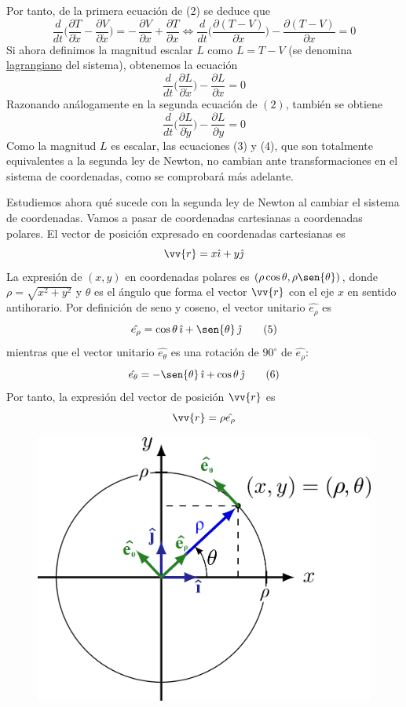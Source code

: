 \documentclass[12pt]{report}
\begin{document}
Por tanto, de la primera ecuación de (2) se deduce que
\[\frac{d}{dt}\biggl(\frac{\partial T}{\partial \dot{x}} - \frac{\partial V}{\partial \dot{x}}\biggr) = - \, \frac{\partial V}{\partial x} + \frac{\partial T}{\partial x} \iff \frac{d}{dt}\biggl( \frac{\partial (T-V)}{\partial \dot{x}} \biggr) - \frac{\partial (T-V)}{\partial x} = 0\]
Si ahora definimos la magnitud escalar $L$ como $L = T - V$ (se denomina \ul{lagrangiano} del sistema), obtenemos la ecuación
\[\frac{d}{dt}\biggl( \frac{\partial L}{\partial \dot{x}}\biggr) - \frac{\partial L}{\partial x} = 0 \tag{3}\]
Razonando análogamente en la segunda ecuación de $(2)$, también se obtiene
\[\frac{d}{dt}\biggl( \frac{\partial L}{\partial \dot{y}}\biggr) - \frac{\partial L}{\partial y} = 0 \tag{4}\]
Como la magnitud $L$ es escalar, las ecuaciones (3) y (4), que son totalmente equivalentes a la segunda ley de Newton, no cambian ante transformaciones en el sistema de coordenadas, como se comprobará más adelante. 

\vspace{2mm}
Estudiemos ahora qué sucede con la segunda ley de Newton al cambiar el sistema de coordenadas. Vamos a pasar de coordenadas cartesianas a coordenadas polares. El vector de posición expresado en coordenadas cartesianas es
\[\vv{r} = x\hat{\imath} + y\hat{\jmath}\]
La expresión de $(x,y)$ en coordenadas polares es $(\rho\cos{\theta},\rho\sen{\theta})$, donde $\rho = \sqrt{x^2+y^2}$ y $\theta$ es el ángulo que forma el vector $\vv{r}$ con el eje $x$ en sentido antihorario.
Por definición de seno y coseno, el vector unitario $\hat{e_\rho}$ es
\[\hat{e_\rho} = \cos{\theta} \, \hat{\imath} + \sen{\theta} \,  \hat{\jmath} \tag{5}\]
mientras que el vector unitario $\hat{e_\theta}$ es una rotación de $90^{\circ}$ de $\hat{e_\rho}$:
\[\hat{e_\theta} = -\sen{\theta} \, \hat{\imath} + \cos{\theta} \, \hat{\jmath} \tag{6}\]
Por tanto, la expresión del vector de posición $\vv{r}$ es
\[\vv{r} = \rho \hat{e_\rho}\]

\begin{figure}[h]
\includegraphics[scale = 0.18]{0}
\centering
\end{figure}
\end{document}
